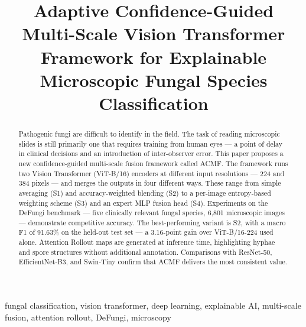 \documentclass[conference]{IEEEtran}
\begin{document}
\title{Adaptive Confidence-Guided Multi-Scale Vision Transformer
Framework for Explainable Microscopic Fungal Species Classification}

\author{
  \and
}

\maketitle

\begin{abstract}
Pathogenic fungi are difficult to identify in the field. The task of reading
microscopic slides is still primarily one that requires training from human
eyes --- a point of delay in clinical decisions and an introduction of
inter-observer error. This paper proposes a new confidence-guided multi-scale
fusion framework called ACMF. The framework runs two Vision Transformer
(ViT-B/16) encoders at different input resolutions --- 224 and 384 pixels ---
and merges the outputs in four different ways. These range from simple
averaging (S1) and accuracy-weighted blending (S2) to a per-image
entropy-based weighting scheme (S3) and an expert MLP fusion head (S4).
Experiments on the DeFungi benchmark --- five clinically relevant fungal
species, 6,801 microscopic images --- demonstrate competitive accuracy.
The best-performing variant is S2, with a macro F1 of 91.63\% on the
held-out test set --- a 3.16-point gain over ViT-B/16-224 used alone.
Attention Rollout maps are generated at inference time, highlighting hyphae
and spore structures without additional annotation. Comparisons with
ResNet-50, EfficientNet-B3, and Swin-Tiny confirm that ACMF delivers the
most consistent value.
\end{abstract}

\begin{IEEEkeywords}
fungal classification, vision transformer, deep learning,
explainable AI, multi-scale fusion, attention rollout, DeFungi, microscopy
\end{IEEEkeywords}
\end{document}
